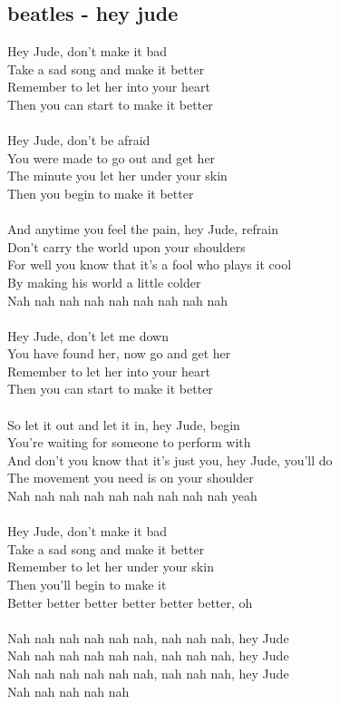 \documentclass[a4paper,12pt]{book} %
\begin{document}
\begin{multicols}{2}
{\chapter{beatles - hey jude}
\noindent
Hey Jude, don't make it bad\\Take a sad song and make it better\\Remember to let her into your heart\\Then you can start to make it better\\\\Hey Jude, don't be afraid\\You were made to go out and get her\\The minute you let her under your skin\\Then you begin to make it better\\\\And anytime you feel the pain, hey Jude, refrain\\Don't carry the world upon your shoulders\\For well you know that it's a fool who plays it cool\\By making his world a little colder\\Nah nah nah nah nah nah nah nah nah\\\\Hey Jude, don't let me down\\You have found her, now go and get her\\Remember to let her into your heart\\Then you can start to make it better\\\\So let it out and let it in, hey Jude, begin\\You're waiting for someone to perform with\\And don't you know that it's just you, hey Jude, you'll do\\The movement you need is on your shoulder\\Nah nah nah nah nah nah nah nah nah yeah\\\\Hey Jude, don't make it bad\\Take a sad song and make it better\\Remember to let her under your skin\\Then you'll begin to make it\\Better better better better better better, oh\\\\Nah nah nah nah nah nah, nah nah nah, hey Jude\\Nah nah nah nah nah nah, nah nah nah, hey Jude\\Nah nah nah nah nah nah, nah nah nah, hey Jude\\Nah nah nah nah nah }
\end{multicols}
\end{document}
